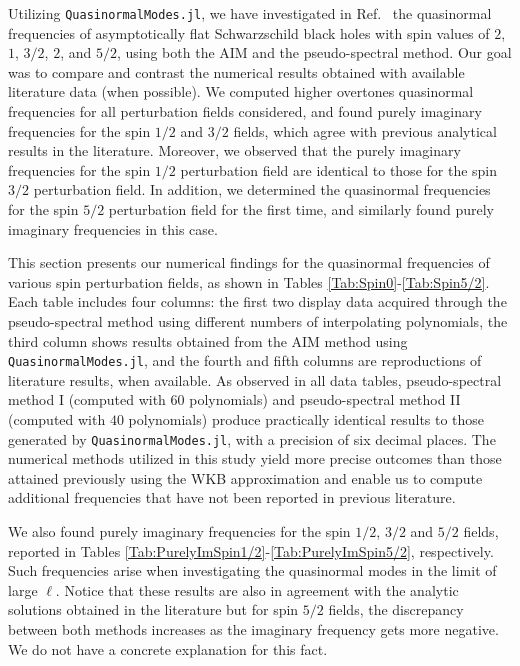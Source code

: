 Utilizing \texttt{QuasinormalModes.jl}, we have investigated in Ref.~\cite{Mamani2022} the quasinormal frequencies of asymptotically flat Schwarzschild black holes with spin values of $2$, $1$, $3/2$, $2$, and $5/2$, using both the AIM and the pseudo-spectral method. Our goal was to compare and contrast the numerical results obtained with available literature data (when possible). We computed higher overtones quasinormal frequencies for all perturbation fields considered, and found purely imaginary frequencies for the spin $1/2$ and $3/2$ fields, which agree with previous analytical results in the literature. Moreover, we observed that the purely imaginary frequencies for the spin $1/2$ perturbation field are identical to those for the spin $3/2$ perturbation field. In addition, we determined the quasinormal frequencies for the spin $5/2$ perturbation field for the first time, and similarly found purely imaginary frequencies in this case.

This section presents our numerical findings for the quasinormal frequencies of various spin perturbation fields, as shown in Tables \ref{Tab:Spin0}-\ref{Tab:Spin5/2}. Each table includes four columns: the first two display data acquired through the pseudo-spectral method using different numbers of interpolating polynomials, the third column shows results obtained from the AIM method using \texttt{QuasinormalModes.jl}, and the fourth and fifth columns are reproductions of literature results, when available. As observed in all data tables, pseudo-spectral method I (computed with $60$ polynomials) and pseudo-spectral method II (computed with $40$ polynomials) produce practically identical results to those generated by \texttt{QuasinormalModes.jl}, with a precision of six decimal places. The numerical methods utilized in this study yield more precise outcomes than those attained previously using the WKB approximation and enable us to compute additional frequencies that have not been reported in previous literature.

We also found purely imaginary frequencies for the spin $1/2$, $3/2$ and $5/2$ fields, reported in Tables \ref{Tab:PurelyImSpin1/2}-\ref{Tab:PurelyImSpin5/2}, respectively. Such frequencies arise when investigating the quasinormal modes in the limit of large $\ell$. Notice that these results are also in agreement with the analytic solutions obtained in the literature but for spin $5/2$ fields, the discrepancy between both methods increases as the imaginary frequency gets more negative. We do not have a concrete explanation for this fact.

